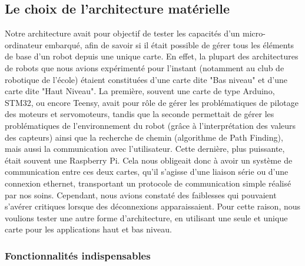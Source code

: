 \documentclass{report}
\begin{document}
    \subsection{Le choix de l'architecture matérielle}

    {Notre architecture avait pour objectif de tester les capacités d'un
    micro-ordinateur embarqué, afin de savoir si il était possible de gérer
    tous les éléments de base d'un robot depuis une unique carte. En effet,
    la plupart des architectures de robots que nous avions expérimenté pour l'instant
    (notamment au club de robotique de l'école) étaient constituées d'une carte
    dite "Bas niveau" et d'une carte dite "Haut Niveau". La première, souvent une carte
    de type Arduino, STM32, ou encore Teensy, avait pour rôle de gérer les
    problématiques de pilotage des moteurs et servomoteurs, tandis que la seconde
    permettait de gérer les problématiques de l'environnement du robot (grâce à l'interprétation
    des valeurs des capteurs) ainsi que la recherche de chemin (algorithme de Path Finding),
    mais aussi la communication avec l'utilisateur. Cette dernière, plus puissante,
    était souvent une Raspberry Pi. Cela nous obligeait donc à avoir
    un système de communication entre ces deux cartes, qu'il s'agisse d'une liaison série
    ou d'une connexion ethernet, transportant un protocole de communication simple réalisé
    par nos soins. Cependant, nous avions constaté des faiblesses qui pouvaient s'avérer
    critiques lorsque des déconnexions apparaissaient. Pour cette raison, nous voulions
    tester une autre forme d'architecture, en utilisant une seule et unique carte pour
    les applications haut et bas niveau.}

    \subsubsection{Fonctionnalités indispensables}
\end{document}
